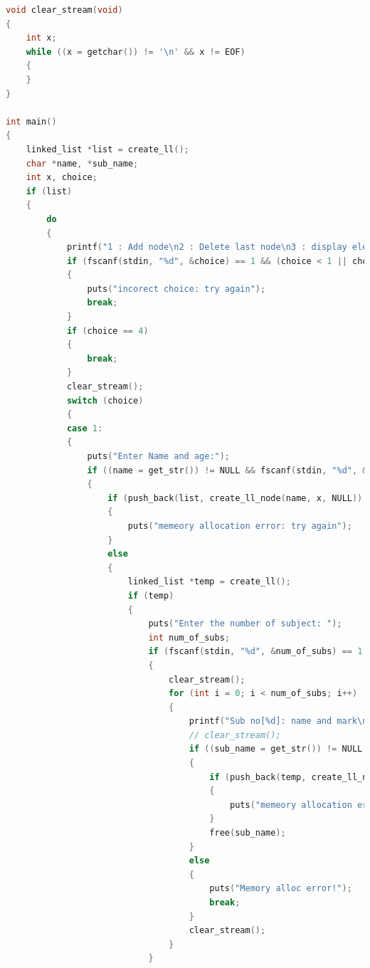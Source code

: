 \documentclass[12pt]{report}
\begin{document}
\begin{lstlisting}[label=some-code,caption=код 2-ого запушеного программа.,language=C]
void clear_stream(void)
{
    int x;
    while ((x = getchar()) != '\n' && x != EOF)
    {
    }
}

int main()
{
    linked_list *list = create_ll();
    char *name, *sub_name;
    int x, choice;
    if (list)
    {
        do
        {
            printf("1 : Add node\n2 : Delete last node\n3 : display elements\n4 : Exit\n");
            if (fscanf(stdin, "%d", &choice) == 1 && (choice < 1 || choice > 4))
            {
                puts("incorect choice: try again");
                break;
            }
            if (choice == 4)
            {
                break;
            }
            clear_stream();
            switch (choice)
            {
            case 1:
            {
                puts("Enter Name and age:");
                if ((name = get_str()) != NULL && fscanf(stdin, "%d", &x) == 1)
                {
                    if (push_back(list, create_ll_node(name, x, NULL)) == error)
                    {
                        puts("memeory allocation error: try again");
                    }
                    else 
                    {
                        linked_list *temp = create_ll();
                        if (temp)
                        {
                            puts("Enter the number of subject: ");
                            int num_of_subs;
                            if (fscanf(stdin, "%d", &num_of_subs) == 1 && num_of_subs > 0)
                            {
                                clear_stream();
                                for (int i = 0; i < num_of_subs; i++)
                                {
                                    printf("Sub no[%d]: name and mark\n", i + 1);
                                    // clear_stream();
                                    if ((sub_name = get_str()) != NULL && fscanf(stdin, "%d", &x) == 1)
                                    {
                                        if (push_back(temp, create_ll_node(sub_name, x, NULL)) == error)
                                        {
                                            puts("memeory allocation error: try again");
                                        }
                                        free(sub_name);
                                    }
                                    else
                                    {
                                        puts("Memory alloc error!");
                                        break;
                                    }
                                    clear_stream();
                                }
                            }

\end{lstlisting}
\end{document}
